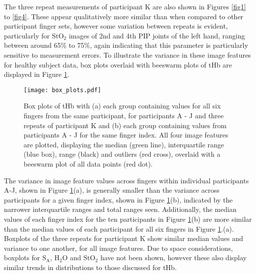 \documentclass[twoside]{bhamthesis}
\theoremstyle{definition}
\begin{document}
The three repeat measurements of participant K are also shown in Figures \ref{fig1} to \ref{fig4}. These appear qualitatively more similar than when compared to other participant finger sets, however some variation between repeats is evident, particularly for $\mathrm{StO_2}$ images of 2nd and 4th PIP joints of the left hand, ranging between around 65\% to 75\%, again indicating that this parameter is particularly sensitive to measurement errors. To illustrate the variance in these image features for healthy subject data, box plots overlaid with beeswarm plots of tHb are displayed in Figure \ref{box_plots}.

\begin{figure}[!ht]
\centering\texttt{[image: box\_plots.pdf]}
\caption{Box plots of tHb with (a) each group containing values for all six fingers from the same participant, for participants A - J and three repeats of participant K and (b) each group containing values from participants A - J for the same finger index. All four image features are plotted, displaying the median (green line), interquartile range (blue box), range (black) and outliers (red cross), overlaid with a beeswarm plot of all data points (red dot).}
\label{box_plots}
\end{figure}

The variance in image feature values across fingers within individual participants A-J, shown in Figure \ref{box_plots}(a), is generally smaller than the variance across participants for a given finger index, shown in Figure \ref{box_plots}(b), indicated by the narrower interquartile ranges and total ranges seen. Additionally, the median values of each finger index for the ten participants in Figure \ref{box_plots}(b) are more similar than the median values of each participant for all six fingers in Figure \ref{box_plots}.(a). Boxplots of the three repeats for participant K show similar median values and variance to one another, for all image features. Due to space considerations, boxplots for $\mathrm{S_A}$, $\mathrm{H_2O}$ and $\mathrm{StO_2}$ have not been shown, however these also display similar trends in distributions to those discussed for tHb.
\end{document}
